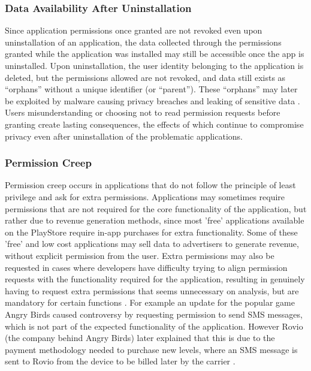 \subsubsection{Data Availability After Uninstallation}
Since application permissions once granted are not revoked even upon uninstallation of an application, the data collected through the permissions granted while the application was installed may still be accessible once the app is uninstalled. Upon uninstallation, the user identity belonging to the application is deleted, but the permissions allowed are not revoked, and data still exists as “orphans” without a unique identifier (or “parent”). These “orphans” may later be exploited by malware causing privacy breaches and leaking of sensitive data \cite{zhang2016life}. Users misunderstanding or choosing not to read permission requests before granting create lasting consequences, the effects of which continue to compromise privacy even after uninstallation of the problematic applications.

\subsubsection{Permission Creep}
Permission creep occurs in applications that do not follow the principle of least privilege and ask for extra permissions\cite{vidas2011curbing}. Applications may sometimes require permissions that are not required for the core functionality of the application, but rather due to revenue generation methods, since most 'free' applications available on the PlayStore require in-app purchases for extra functionality. Some of these 'free' and low cost applications may sell data to advertisers to generate revenue, without explicit permission from the user. Extra permissions may also be requested in cases where developers have difficulty trying to align permission requests with the functionality required for the application, resulting in genuinely having to request extra permissions that seems unnecessary on analysis, but are mandatory for certain functions \cite{vidas2011curbing}. For example an update for the popular game Angry Birds caused controversy by requesting permission to send SMS messages, which is not part of the expected functionality of the application. However Rovio (the company behind Angry Birds) later explained that this is due to the payment methodology needed to purchase new levels, where an SMS message is sent to Rovio from the device to be billed later by the carrier \cite{w} \cite{u}. 
\smallskip

